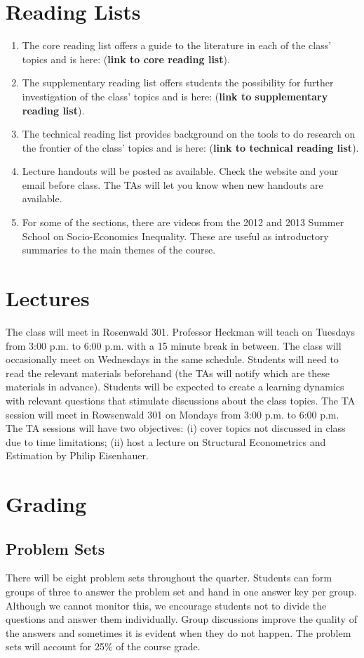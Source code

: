 \documentclass[12pt]{article}
\begin{document}
\section{Reading Lists}
\begin{enumerate}
\item The core reading list offers a guide to the literature in each of the class' topics and  is here: (\textbf{link to core reading list}).
\item The supplementary reading list offers students the possibility for further investigation of the class' topics and is here: (\textbf{link to supplementary reading list}).
\item The technical reading list provides background on the tools to do research on the frontier of the class' topics and is here: (\textbf{link to technical  reading list}).
\item Lecture handouts will be posted as available. Check the website and your email before class. The TAs will let you know when new handouts are available.
\item For some of the sections, there are videos from the 2012 and 2013 Summer School on Socio-Economics Inequality. These are useful as introductory summaries to the main themes of the course.
\end{enumerate}

\section{Lectures}
\noindent The class will meet in Rosenwald 301. Professor Heckman will teach on Tuesdays from 3:00 p.m. to 6:00 p.m. with a 15 minute break in between. The class will occasionally meet on Wednesdays in the same schedule. Students will need to read the relevant materials beforehand (the TAs will notify which are these materials in advance). Students will be expected to create a learning dynamics with relevant questions that stimulate discussions about the class topics. The TA session will meet in Rowsenwald 301 on Mondays from 3:00 p.m. to 6:00 p.m. The TA sessions will have two objectives: (i) cover topics not discussed in class due to time limitations; (ii) host a lecture on Structural Econometrics and Estimation by Philip Eisenhauer.

\section{Grading}
\subsection{Problem Sets}
\noindent There will be eight problem sets throughout the quarter. Students can form groups of three to answer the problem set and hand in one answer key per group. Although we cannot monitor this, we encourage students not to divide the questions and answer them individually. Group discussions improve the quality of the answers and sometimes it is evident when they do not happen. The problem sets will account for 25\% of the course grade.
\end{document}
